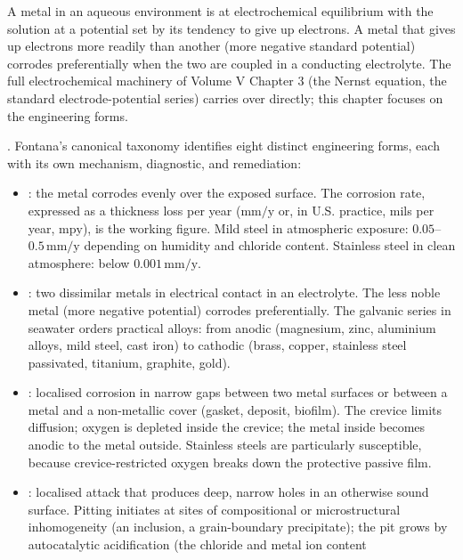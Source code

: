 A metal in an aqueous environment is at electrochemical equilibrium
with the solution at a potential set by its tendency to give up
electrons. A metal that gives up electrons more readily than another
(more negative standard potential) corrodes preferentially when the
two are coupled in a conducting electrolyte. The full electrochemical
machinery of Volume V Chapter 3 (the Nernst equation, the standard
electrode-potential series) carries over directly; this chapter
focuses on the engineering forms.

. Fontana's canonical taxonomy
\cite[ch.~3]{text:fontana-corrosion} identifies eight distinct
engineering forms, each with its own mechanism, diagnostic, and
remediation:

\begin{itemize}[leftmargin=*]
\item {}: the metal corrodes evenly over the
  exposed surface. The corrosion rate, expressed as a thickness loss
  per year ($\text{mm}/\text{y}$ or, in U.S. practice, mils per year,
  $\text{mpy}$), is the working figure. Mild steel in atmospheric
  exposure: $0.05$--$0.5\,\text{mm}/\text{y}$ depending on humidity
  and chloride content. Stainless steel in clean atmosphere: below
  $0.001\,\text{mm}/\text{y}$.
\item {}: two dissimilar metals in
  electrical contact in an electrolyte. The less noble metal (more
  negative potential) corrodes preferentially. The galvanic series
  in seawater orders practical alloys: from anodic (magnesium, zinc,
  aluminium alloys, mild steel, cast iron) to cathodic (brass,
  copper, stainless steel passivated, titanium, graphite, gold).
\item {}: localised corrosion in narrow gaps
  between two metal surfaces or between a metal and a non-metallic
  cover (gasket, deposit, biofilm). The crevice limits diffusion;
  oxygen is depleted inside the crevice; the metal inside becomes
  anodic to the metal outside. Stainless steels are particularly
  susceptible, because crevice-restricted oxygen breaks down the
  protective passive film.
\item {}: localised attack that produces
  deep, narrow holes in an otherwise sound surface. Pitting initiates
  at sites of compositional or microstructural inhomogeneity (an
  inclusion, a grain-boundary precipitate); the pit grows by
  autocatalytic acidification (the chloride and metal ion content

\end{itemize}
